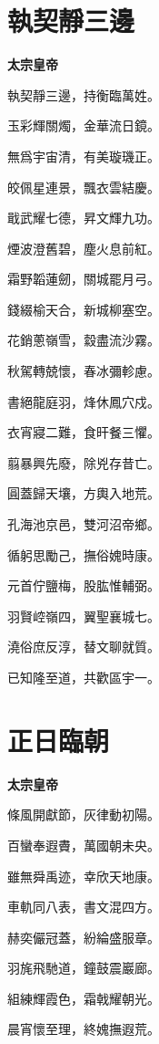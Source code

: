 \documentclass[12pt,a4paper]{ctexbook}
\begin{document}
\section{執契靜三邊}
\textbf{太宗皇帝}\par\vspace{0.5em}
執契靜三邊，持衡臨萬姓。\par
玉彩輝關燭，金華流日鏡。\par
無爲宇宙清，有美璇璣正。\par
皎佩星連景，飄衣雲結慶。\par
戢武耀七德，昇文輝九功。\par
煙波澄舊碧，塵火息前紅。\par
霜野韜蓮劒，關城罷月弓。\par
錢綴榆天合，新城柳塞空。\par
花銷蔥嶺雪，縠盡流沙霧。\par
秋駕轉兢懷，春冰彌軫慮。\par
書絕龍庭羽，烽休鳳穴戍。\par
衣宵寢二難，食旰餐三懼。\par
翦暴興先廢，除兇存昔亡。\par
圓蓋歸天壤，方輿入地荒。\par
孔海池京邑，雙河沼帝鄉。\par
循躬思勵己，撫俗媿時康。\par
元首佇鹽梅，股肱惟輔弼。\par
羽賢崆嶺四，翼聖襄城七。\par
澆俗庶反淳，替文聊就質。\par
已知隆至道，共歡區宇一。\par

\section{正日臨朝}
\textbf{太宗皇帝}\par\vspace{0.5em}
條風開獻節，灰律動初陽。\par
百蠻奉遐賮，萬國朝未央。\par
雖無舜禹迹，幸欣天地康。\par
車軌同八表，書文混四方。\par
赫奕儼冠蓋，紛綸盛服章。\par
羽旄飛馳道，鐘鼓震巖廊。\par
組練輝霞色，霜戟耀朝光。\par
晨宵懷至理，終媿撫遐荒。\par
\end{document}
